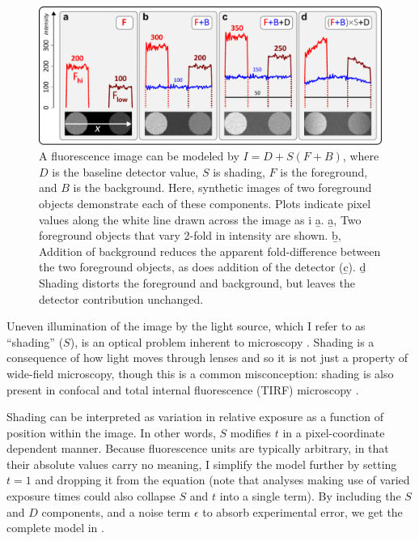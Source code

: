   \begin{figure}[!bt]
  \centering
  \includegraphics[width=5in]{FIGS/imaging/components.pdf}
  {\singlespacing 
  \caption[ Components of a fluorescence image.]
            { A fluorescence image can be modeled by
            $I=D+S(F+B)$, where $D$ is the baseline detector value,
            $S$ is shading, $F$ is the foreground, and $B$ is the
            background. Here, synthetic images of two foreground
            objects demonstrate each of these
            components. Plots indicate pixel values along the white line
            drawn across the image as i \b{a}. \b{a}, Two foreground objects that
            vary 2-fold in intensity are shown. \b{b}, Addition of
            background reduces the apparent fold-difference between the
            two foreground objects, as does addition of the detector
            (\b{c}). \b{d} Shading distorts the foreground and background,
            but leaves the detector contribution unchanged.}
  \label{fig:imaging:components}}
  \end{figure}



Uneven illumination of the image by the light source,
which I refer to as ``shading'' ($S$),
is an optical problem inherent to microscopy
\cite{Hiraoka1987,Inoue1997,Murray2007,Fiolka2008}. Shading
is a consequence of how light moves through lenses and so it is
not just a property of wide-field microscopy,
though this is a common misconception: shading is also present in confocal
and total internal fluorescence (TIRF) microscopy \cite{Fiolka2008,Herbert2012}.


Shading can be interpreted as variation in relative
exposure as a function of position within the image.
In other words, $S$ modifies
$t$ in a pixel-coordinate dependent manner. Because fluorescence units
are typically arbitrary, in that their absolute values carry
no meaning, I simplify the model further by setting $t=1$
and dropping it from the equation
(note that analyses making use of varied exposure
times could also collapse $S$ and $t$ into a single term).
By including the $S$ and $D$ components,
and a noise term $\epsilon$ to absorb
experimental error, we get the complete model in
.


